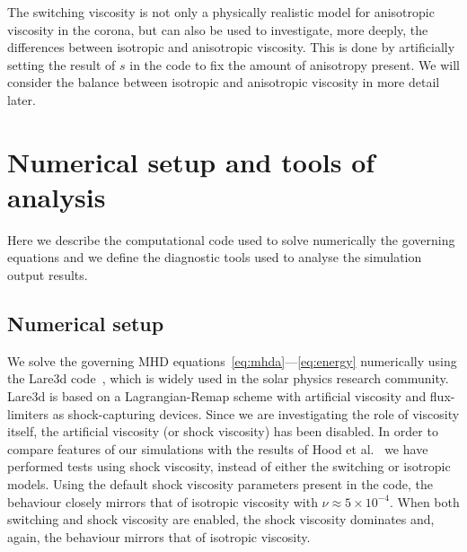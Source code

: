 The switching viscosity is not only a physically realistic model for
anisotropic viscosity in the corona, but can also be used to investigate, more deeply, the differences between isotropic and anisotropic viscosity. This is done by artificially setting the result of $s$ in the code to fix the amount of anisotropy present. We will consider the balance between isotropic and anisotropic viscosity in more detail later.


\section{Numerical setup and tools of analysis}
\label{sec:general-numerical-setup}

Here we describe the computational code used to solve numerically the
governing equations and we define the diagnostic tools used to
analyse the simulation output results.

\subsection{Numerical setup}

We solve the governing MHD equations~\eqref{eq:mhda}---\eqref{eq:energy} numerically using the Lare3d
code~\cite{arberStaggeredGridLagrangian2001}, which is widely used in
the solar physics research community. Lare3d is based on a
Lagrangian-Remap scheme with artificial viscosity and flux-limiters as
shock-capturing devices. Since we are investigating the role of
viscosity itself, the artificial viscosity (or shock viscosity) has been disabled. In
order to compare features of our simulations with the results of Hood
et al.~\cite{hoodCoronalHeatingMagnetic2009} we have performed tests
using shock viscosity, instead of either the switching or isotropic models. Using the default shock viscosity parameters present in the code, the behaviour closely mirrors that of isotropic viscosity with $\nu\approx 5\times10^{-4}$. When both switching and shock viscosity are enabled, the shock viscosity dominates and, again, the behaviour mirrors that of isotropic viscosity.

